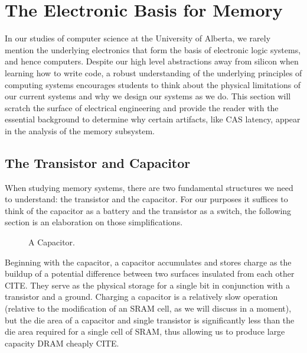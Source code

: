 \section{The Electronic Basis for Memory}

In our studies of computer science at the University of Alberta, we rarely mention the underlying electronics that form the basis of electronic logic systems, and hence computers. Despite our high level abstractions away from silicon when learning how to write code, a robust understanding of the underlying principles of computing systems encourages students to think about the physical limitations of our current systems and why we design our systems as we do. This section will scratch the surface of electrical engineering and provide the reader with the essential background to determine why certain artifacts, like CAS latency, appear in the analysis of the memory subsystem.

\subsection{The Transistor and Capacitor}

When studying memory systems, there are two fundamental structures we need to understand: the transistor and the capacitor. For our purposes it suffices to think of the capacitor as a battery and the transistor as a switch, the following section is an elaboration on those simplifications.

\begin{figure}
  \centering
  \caption{A Capacitor.}
\end{figure}
Beginning with the capacitor, a capacitor accumulates and stores charge as the buildup of a potential difference between two surfaces insulated from each other CITE. They serve as the physical storage for a single bit in conjunction with a transistor and a ground. Charging a capacitor is a relatively slow operation (relative to the modification of an SRAM cell, as we will discuss in a moment), but the die area of a capacitor and single transistor is significantly less than the die area required for a single cell of SRAM, thus allowing us to produce large capacity DRAM cheaply CITE.

